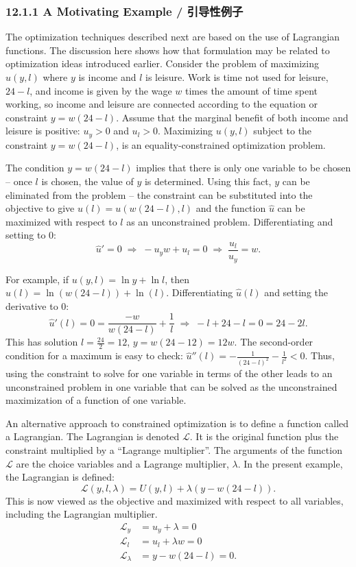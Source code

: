 \subsubsection{12.1.1 A Motivating Example / 引导性例子}

\begin{original}
The optimization techniques described next are based on the use of Lagrangian functions. The discussion here shows how that formulation may be related to optimization ideas introduced earlier. Consider the problem of maximizing $u(y, l)$ where $y$ is income and $l$ is leisure. Work is time not used for leisure, $24 - l$, and income is given by the wage $w$ times the amount of time spent working, so income and leisure are connected according to the equation or constraint $y = w(24-l)$. Assume that the marginal benefit of both income and leisure is positive: $u_y > 0$ and $u_l > 0$. Maximizing $u(y, l)$ subject to the constraint $y = w(24-l)$, is an equality-constrained optimization problem.

The condition $y = w(24-l)$ implies that there is only one variable to be chosen -- once $l$ is chosen, the value of $y$ is determined. Using this fact, $y$ can be eliminated from the problem -- the constraint can be substituted into the objective to give $\hat{u}(l) = u(w(24-l), l)$ and the function $\hat{u}$ can be maximized with respect to $l$ as an unconstrained problem. Differentiating and setting to 0:
\[
\hat{u}' = 0 \;\Rightarrow\; -u_y w + u_l = 0 \;\Rightarrow\; \frac{u_l}{u_y} = w.
\]

For example, if $u(y, l) = \ln y + \ln l$, then $\hat{u}(l) = \ln(w(24-l)) + \ln(l)$. Differentiating $\hat{u}(l)$ and setting the derivative to 0:
\[
\hat{u}'(l) = 0 = \frac{-w}{w(24-l)} + \frac{1}{l} \;\Rightarrow\; -l + 24 - l = 0 = 24 - 2l.
\]
This has solution $l = \frac{24}{2} = 12$, $y = w(24-12) = 12w$. The second-order condition for a maximum is easy to check: $\hat{u}''(l) = -\frac{1}{(24-l)^2} - \frac{1}{l^2} < 0$. Thus, using the constraint to solve for one variable in terms of the other leads to an unconstrained problem in one variable that can be solved as the unconstrained maximization of a function of one variable.

An alternative approach to constrained optimization is to define a function called a Lagrangian. The Lagrangian is denoted $\mathcal{L}$. It is the original function plus the constraint multiplied by a ``Lagrange multiplier''. The arguments of the function $\mathcal{L}$ are the choice variables and a Lagrange multiplier, $\lambda$. In the present example, the Lagrangian is defined:
\[
\mathcal{L}(y, l, \lambda) = U(y, l) + \lambda(y - w(24-l)).
\]
This is now viewed as the objective and maximized with respect to all variables, including the Lagrangian multiplier.
\begin{align}
\mathcal{L}_y &= u_y + \lambda = 0 \tag{12.1}\\
\mathcal{L}_l &= u_l + \lambda w = 0 \tag{12.2}\\
\mathcal{L}_\lambda &= y - w(24-l) = 0. \tag{12.3}
\end{align}


\end{original}

